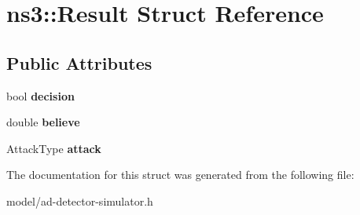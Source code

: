 \hypertarget{structns3_1_1Result}{}\section{ns3\+:\+:Result Struct Reference}
\label{structns3_1_1Result}
\subsection*{Public Attributes}
\begin{DoxyCompactItemize}
\item 
\hypertarget{structns3_1_1Result_a28a2cd9bc91b652e3e91365bcde4cece}{}bool {\bfseries decision}\label{structns3_1_1Result_a28a2cd9bc91b652e3e91365bcde4cece}

\item 
\hypertarget{structns3_1_1Result_ac63824fdff365c8af4f1743dbf378292}{}double {\bfseries believe}\label{structns3_1_1Result_ac63824fdff365c8af4f1743dbf378292}

\item 
\hypertarget{structns3_1_1Result_a6072479933a4562df77ae627df941c3d}{}Attack\+Type {\bfseries attack}\label{structns3_1_1Result_a6072479933a4562df77ae627df941c3d}

\end{DoxyCompactItemize}


The documentation for this struct was generated from the following file\+:\begin{DoxyCompactItemize}
\item 
model/ad-\/detector-\/simulator.\+h\end{DoxyCompactItemize}

